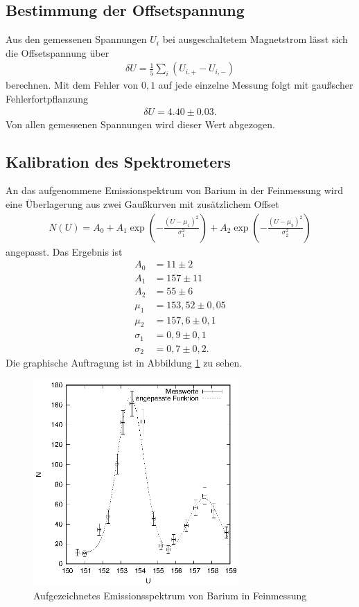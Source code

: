 \subsection{Bestimmung der Offsetspannung}
Aus den gemessenen Spannungen $U_i$ bei ausgeschaltetem Magnetstrom lässt sich die Offsetspannung über
\begin{align*}
  \delta U=\frac{1}{5}\sum_i (U_{i,+}-U_{i,-})
\end{align*}
berechnen. Mit dem Fehler von $0,1$ auf jede einzelne Messung folgt mit gaußscher Fehlerfortpflanzung
\begin{align*}
  \delta U=4.40\pm 0.03.
\end{align*}
Von allen gemessenen Spannungen wird dieser Wert abgezogen.

\subsection{Kalibration des Spektrometers}
An das aufgenommene Emissionspektrum von Barium in der Feinmessung wird eine Überlagerung aus zwei Gaußkurven mit zusätzlichem Offset
\begin{align}
  N(U)=A_0+A_1\exp \left(-\frac{(U-\mu_1)^2}{\sigma_1^2}\right) +A_2\exp\left(-\frac{(U-\mu_2)^2}{\sigma_2^2} \right)
\label{eq:gauss}
\end{align}
angepasst. Das Ergebnis ist
\begin{align*}
  A_0&=11\pm 2\\
  A_1&=157\pm 11\\
  A_2&=55\pm 6\\
  \mu_1&=153,52 \pm 0,05\\
  \mu_2&=157,6 \pm 0,1\\
  \sigma_1&=0,9 \pm 0,1\\
  \sigma_2&=0,7 \pm 0,2.
\end{align*}
Die graphische Auftragung ist in Abbildung \ref{fig:ba_fein} zu sehen.
\begin{figure}[h]
  \centering
  \includegraphics[width=0.7\textwidth]{data/Ba_fein.eps}
  \caption{Aufgezeichnetes Emissionsspektrum von Barium in Feinmessung}
  \label{fig:ba_fein}
\end{figure}

